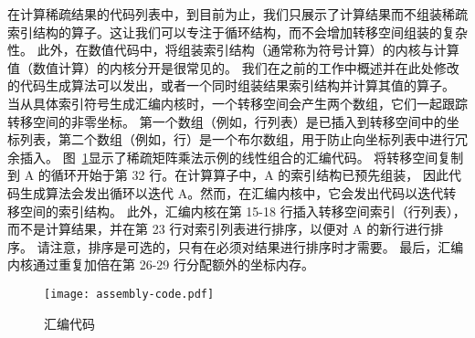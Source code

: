 \begin{translation}
在计算稀疏结果的代码列表中，到目前为止，我们只展示了计算结果而不组装稀疏索引结构的算子。这让我们可以专注于循环结构，而不会增加转移空间组装的复杂性。
此外，在数值代码中，将组装索引结构（通常称为符号计算）的内核与计算值（数值计算）的内核分开是很常见的。 
我们在之前的工作中概述并在此处修改的代码生成算法可以发出，或者一个同时组装结果索引结构并计算其值的算子。 
当从具体索引符号生成汇编内核时，一个转移空间会产生两个数组，它们一起跟踪转移空间的非零坐标。 
第一个数组（例如，行列表）是已插入到转移空间中的坐标列表，第二个数组（例如，行）是一个布尔数组，用于防止向坐标列表中进行冗余插入。 
图~\ref{fig:assembly-code}显示了稀疏矩阵乘法示例的线性组合的汇编代码。 将转移空间复制到 A 的循环开始于第 32 行。在计算算子中，A 的索引结构已预先组装，
因此代码生成算法会发出循环以迭代 A。然而，在汇编内核中，它会发出代码以迭代转移空间的索引结构。 
此外，汇编内核在第 15-18 行插入转移空间索引（行列表），而不是计算结果，并在第 23 行对索引列表进行排序，以便对 A 的新行进行排序。 
请注意，排序是可选的，只有在必须对结果进行排序时才需要。 最后，汇编内核通过重复加倍在第 26-29 行分配额外的坐标内存。
\begin{figure}
  \centering
  \texttt{[image: assembly-code.pdf]}
  \caption{汇编代码}
  \label{fig:assembly-code}
\end{figure}


\end{translation}
